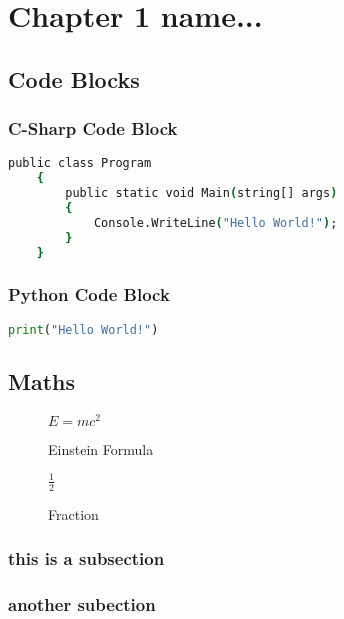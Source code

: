 \chapter{Chapter 1 name...}


\section{Code Blocks}

\subsection{C-Sharp Code Block}

\begin{lstlisting}[language=csh]
    public class Program
    {
        public static void Main(string[] args)
        {
            Console.WriteLine("Hello World!");
        }
    }
\end{lstlisting}

\subsection{Python Code Block}

\begin{lstlisting}[language=python]
    print("Hello World!")
\end{lstlisting}

\newpage


\section{Maths}

\begin{figure}[ht]
    \centering
    \begin{math}
        E=mc^2 
    \end{math}
    \caption{Einstein Formula}
    \label{fig:Emc2}

\end{figure}

\begin{figure}[ht]
    \centering
    \begin{math}
        \frac{1}{2} 
    \end{math}
    \caption{Fraction}
    \label{fig:Fraction 1}

\end{figure}

\subsection{this is a subsection}

\lipsum[7-8]

\subsection{another subection}

\lipsum[4-6]
